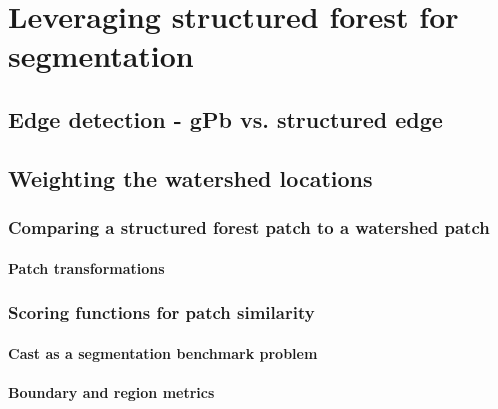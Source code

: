 \chapter{Leveraging structured forest for segmentation}
\label{Chapter4}
\section{Edge detection - gPb vs. structured edge}
\section{Weighting the watershed locations}
\subsection{Comparing a structured forest patch to a watershed patch}
\subsubsection{Patch transformations}
\subsection{Scoring functions for patch similarity}
\subsubsection{Cast as a segmentation benchmark problem}
\subsubsection{Boundary and region metrics}
